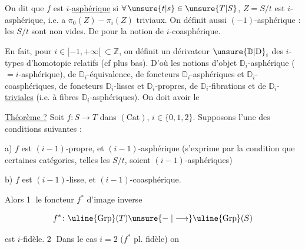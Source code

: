 
 On dit que $f$ est $i$-\uline{asphérique} si $\forall\,\unsure{t|s}\in\unsure{T|S}$, $Z=S/t$ est $i$-asphérique,  i.e. a $\pi_0(Z)\mathrel{-}\pi_i(Z)$ triviaux. On définit aussi $(-1)$-asphérique : les $S/t$ sont non vides. De  pour la notion de $i$-coasphérique.


En fait, pour $i\in[-1,+\infty[\ \subset\mathbb Z$, on définit un dérivateur $\unsure{\mathbb D|\mathrm D}_i$ des $i$-types d'homotopie relatifs (cf plus bas). D'où les notions d'objet $\mathbb D_i$-asphérique ($=i$-asphérique), de $\mathbb D_i$-équivalence, de foncteurs $\mathbb D_i$-asphériques et $\mathbb D_i$-coasphériques, de foncteurs $\mathbb D_i$-lisses et $\mathbb D_i$-propres, de $\mathbb D_i$-fibrations et de $\mathbb D_i$- \uline{triviales}  (i.e. à fibres $\mathbb D_i$-asphériques). On doit avoir le

\uline{Théorème ?} Soit $f\colon S\longrightarrow T$ dans $(\mathrm{Cat})$, $i\in\{0,1,2\}$.   Supposons l'une des conditions suivantes  :

a) $f$ est $(i-1)$-propre, et $(i-1)$-asphérique (s'exprime par la condition que certaines catégories, telles les $S/t$, soient $(i-1)$-asphériques)

b) $f$ est $(i-1)$-lisse, et $(i-1)$-coasphérique.

Alors \textcircled{1} le foncteur $f^*$ d'image inverse

\[
f^*\colon\uline{\mathrm{Grp}}(T)\unsure{\mathrel{-}|\longrightarrow}\uline{\mathrm{Grp}}(S)
\]

est $i$-fidèle. \textcircled{2} Dans le cas $i=2$ ($f^*$ pl. fidèle) on
